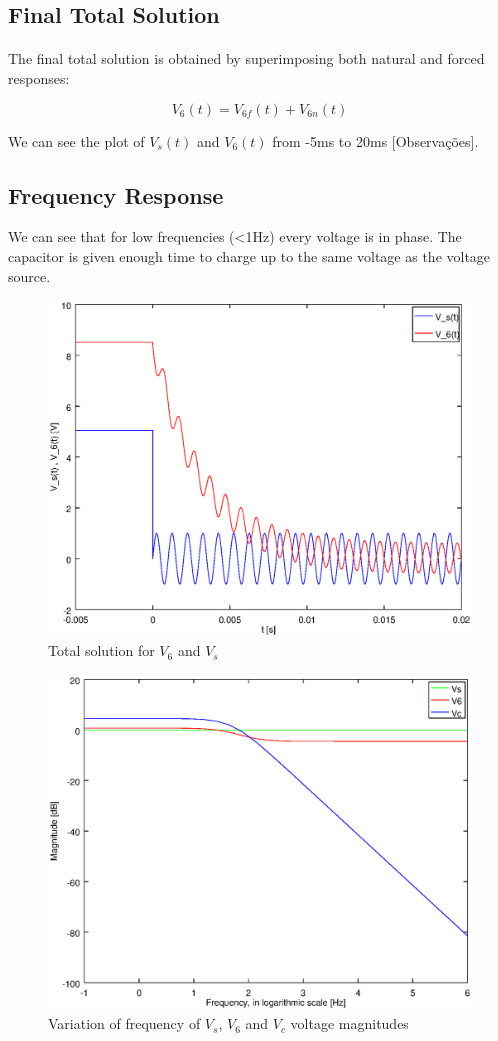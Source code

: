 \subsection{Final Total Solution}

\paragraph{} The final total solution is obtained by superimposing both natural and forced responses:

\begin{equation}
	V_6(t) = V_{6f}(t) + V_{6n}(t)
\end{equation}

We can see the plot of $V_s(t)$ and $V_6(t)$ from -5ms to 20ms [Observações].

\subsection{Frequency Response}

We can see that for low frequencies (<1Hz) every voltage is in phase. The capacitor is given enough time to charge up to the same voltage 
as the voltage source.

\begin{figure}[!h]
	\centering
	\includegraphics[width=0.7\linewidth]{total.eps}
	\caption{Total solution for $V_6$ and $V_s$}
\end{figure}

\begin{figure}[!h]
	\centering
	\includegraphics[width=0.7\linewidth]{magnitude.eps}
	\caption{Variation of frequency of $V_s$, $V_6$ and $V_c$ voltage magnitudes}
\end{figure}

